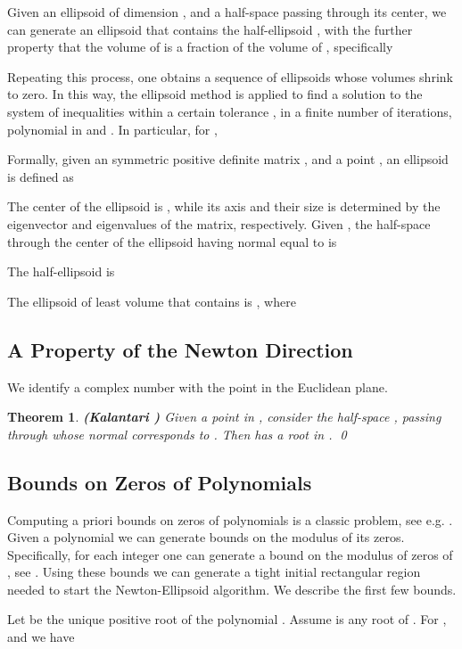 \documentclass{article}
\newtheorem{theorem}{Theorem}
\begin{document}
Given  an ellipsoid  of dimension ,  and a half-space  passing through its center, we can generate an ellipsoid  that contains the half-ellipsoid , with the further property that  the volume of  is a fraction of the volume of , specifically

Repeating this process, one obtains a sequence of ellipsoids whose volumes shrink to zero.  In this way, the ellipsoid method is applied to find a solution to the system of inequalities within a certain tolerance , in a finite number of iterations, polynomial in  and .  In particular, for , 

Formally, given an   symmetric positive definite matrix , and a point , an ellipsoid is defined as

The center of the ellipsoid is , while its axis and their size is determined by the eigenvector and eigenvalues of the matrix, respectively. Given , the half-space through the center of the ellipsoid having normal equal to  is

The half-ellipsoid is

The ellipsoid of least volume that contains  is , where


\subsection{A Property of the Newton Direction}

We identify a complex number  with the point  in the Euclidean plane.

\begin{theorem} \label{FTA} {\bf (Kalantari \cite{kalFTA})}
Given a point  in , consider the half-space , passing through  whose normal corresponds to . Then  has a root in . \qed
\end{theorem}

\subsection{Bounds on Zeros of Polynomials}  Computing a priori bounds on zeros of polynomials is a classic problem, see e.g. \cite{mc2005}.  Given a polynomial  we can generate bounds on the modulus of its zeros. Specifically, for each integer    one can generate a bound on the modulus of zeros of , see \cite{kalbound}. Using these bounds we can generate a tight initial rectangular region needed to start the Newton-Ellipsoid algorithm. We describe the first few bounds.

Let   be the unique positive root of the
polynomial .   Assume  is any root of . For ,  and we have
\end{document}

